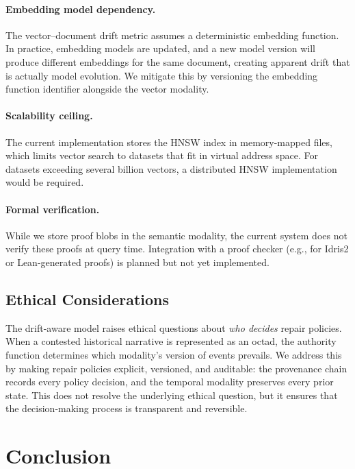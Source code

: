 \documentclass[11pt,twocolumn]{article}
\begin{document}
\paragraph{Embedding model dependency.}  The vector--document drift metric
assumes a deterministic embedding function.  In practice, embedding models
are updated, and a new model version will produce different embeddings for
the same document, creating apparent drift that is actually model evolution.
We mitigate this by versioning the embedding function identifier alongside
the vector modality.

\paragraph{Scalability ceiling.}  The current implementation stores the HNSW
index in memory-mapped files, which limits vector search to datasets that fit
in virtual address space.  For datasets exceeding several billion vectors,
a distributed HNSW implementation would be required.

\paragraph{Formal verification.}  While we store proof blobs in the semantic
modality, the current system does not verify these proofs at query time.
Integration with a proof checker (e.g., for Idris2 or Lean-generated proofs)
is planned but not yet implemented.

\subsection{Ethical Considerations}

The drift-aware model raises ethical questions about \emph{who decides}
repair policies.  When a contested historical narrative is represented as
an octad, the authority function determines which modality's version of
events prevails.  We address this by making repair policies explicit,
versioned, and auditable: the provenance chain records every policy
decision, and the temporal modality preserves every prior state.  This
does not resolve the underlying ethical question, but it ensures that
the decision-making process is transparent and reversible.

\section{Conclusion}\label{sec:conclusion}
\end{document}
